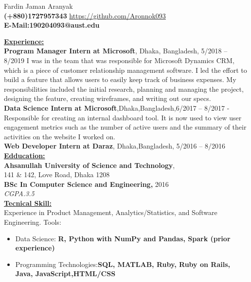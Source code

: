 \documentclass[a4paper,12pt]{article}
\begin{document}
	\centering
	\huge Fardin Jaman Aranyak\\
	\normalsize
	\textbf{(+880)1727957343} \textcolor{blue}{\url{https://github.com/Aronnok093}}\\
	\textbf{{E-Mail:190204093@aust.edu}}\\
	\raggedright\large \underline{\textbf{Experience:}}\\
	\quad\textbf{Program Manager Intern at Microsoft}, Dhaka, Bangladesh, 5/2018 – 8/2019
	I was in the team that was responsible for Microsoft Dynamics CRM, which is a piece of
	customer relationship management software. I led the effort to build a feature that allows users to
	easily keep track of business expenses. My responsibilities included the initial research, planning and
	managing the project, designing the feature, creating wireframes, and writing out our specs.\\
	\vspace{12pt}
	\quad\textbf{Data Science Intern at Microsoft},Dhaka,Bangladesh,6/2017 – 8/2017
	- Responsible for creating an internal dashboard tool. It is now used to view user
	engagement metrics such as the number of active users and the summary of their
	activities on the website I worked on.\\
	\vspace{12pt}
	\quad\textbf{Web Developer Intern at Daraz}, Dhaka,Bangladesh, 5/2016 – 8/2016\\
	\vspace{7pt}
	\large\underline{\textbf{Edducation:}} \\
	\quad\textbf{Ahsanullah University of Science and Technology},\\141 \& 142, Love Road, Dhaka 1208\\ \textbf{BSc In Computer Science and Engineering,} 2016\\
	\textit{CGPA.3.5}
	\vspace{7pt}\\
	\textbf{\underline{Tecnical Skill:}}\\
	\quad Experience in Product Management, Analytics/Statistics, and Software Engineering.
	Tools:\\
	\begin{itemize}
		\item Data Science: \textbf{R, Python with NumPy and Pandas, Spark (prior experience)}
		\item Programming Technologies:\textbf{SQL, MATLAB, Ruby, Ruby on Rails, Java, JavaScript,HTML/CSS}
	\end{itemize}
\end{document}
